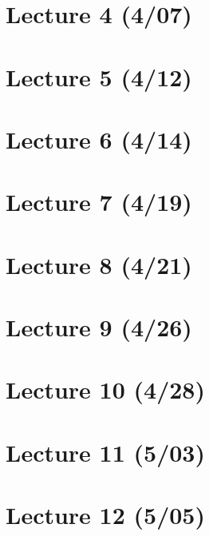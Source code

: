 \section{Lecture 4 (4/07)}

\newpage

\section{Lecture 5 (4/12)}

\newpage

\section{Lecture 6 (4/14)}

\newpage

\section{Lecture 7 (4/19)}

\newpage

\section{Lecture 8 (4/21)}

\newpage

\section{Lecture 9 (4/26)}

\newpage

\section{Lecture 10 (4/28)}

\newpage

\section{Lecture 11 (5/03)}

\newpage

\section{Lecture 12 (5/05)}

\newpage

